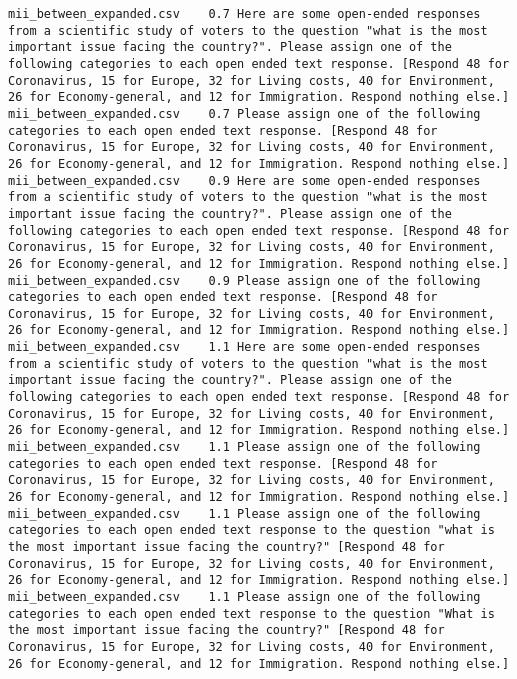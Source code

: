 \begin{lstlisting}[label=lst:promptvariants]
mii_between_expanded.csv	0.7	Here are some open-ended responses from a scientific study of voters to the question "what is the most important issue facing the country?". Please assign one of the following categories to each open ended text response. [Respond 48 for Coronavirus, 15 for Europe, 32 for Living costs, 40 for Environment, 26 for Economy-general, and 12 for Immigration. Respond nothing else.]
mii_between_expanded.csv	0.7	Please assign one of the following categories to each open ended text response. [Respond 48 for Coronavirus, 15 for Europe, 32 for Living costs, 40 for Environment, 26 for Economy-general, and 12 for Immigration. Respond nothing else.]
mii_between_expanded.csv	0.9	Here are some open-ended responses from a scientific study of voters to the question "what is the most important issue facing the country?". Please assign one of the following categories to each open ended text response. [Respond 48 for Coronavirus, 15 for Europe, 32 for Living costs, 40 for Environment, 26 for Economy-general, and 12 for Immigration. Respond nothing else.]
mii_between_expanded.csv	0.9	Please assign one of the following categories to each open ended text response. [Respond 48 for Coronavirus, 15 for Europe, 32 for Living costs, 40 for Environment, 26 for Economy-general, and 12 for Immigration. Respond nothing else.]
mii_between_expanded.csv	1.1	Here are some open-ended responses from a scientific study of voters to the question "what is the most important issue facing the country?". Please assign one of the following categories to each open ended text response. [Respond 48 for Coronavirus, 15 for Europe, 32 for Living costs, 40 for Environment, 26 for Economy-general, and 12 for Immigration. Respond nothing else.]
mii_between_expanded.csv	1.1	Please assign one of the following categories to each open ended text response. [Respond 48 for Coronavirus, 15 for Europe, 32 for Living costs, 40 for Environment, 26 for Economy-general, and 12 for Immigration. Respond nothing else.]
mii_between_expanded.csv	1.1	Please assign one of the following categories to each open ended text response to the question "what is the most important issue facing the country?" [Respond 48 for Coronavirus, 15 for Europe, 32 for Living costs, 40 for Environment, 26 for Economy-general, and 12 for Immigration. Respond nothing else.]
mii_between_expanded.csv	1.1	Please assign one of the following categories to each open ended text response to the question "What is the most important issue facing the country?" [Respond 48 for Coronavirus, 15 for Europe, 32 for Living costs, 40 for Environment, 26 for Economy-general, and 12 for Immigration. Respond nothing else.]

\end{lstlisting}
